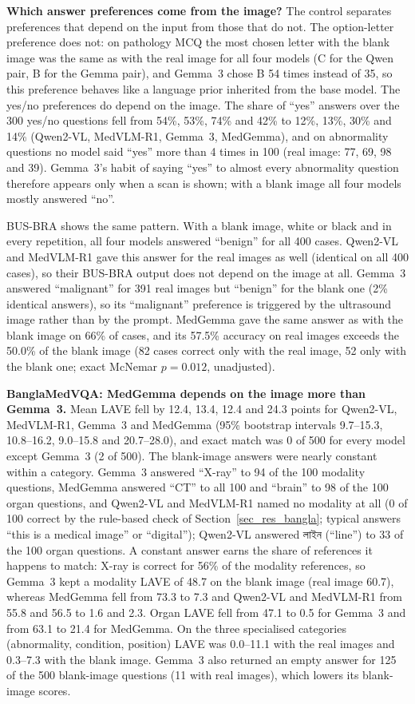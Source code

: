 \documentclass[doublecolumn]{ijcvsplatex}
\newcommand{\bn}[1]{{\bengalifont #1}}
\newcommand{\bn}[1]{\textit{[Bangla]}}
\newcommand{\qwen}{Qwen2-VL}
\newcommand{\medvlm}{MedVLM-R1}
\newcommand{\gemma}{Gemma~3}
\newcommand{\medgemma}{MedGemma}
\begin{document}
{\color{blue}
\textbf{Which answer preferences come from the image?} The control separates preferences that depend on the input from those that do not. The option-letter preference does not: on pathology MCQ the most chosen letter with the blank image was the same as with the real image for all four models (C for the Qwen pair, B for the Gemma pair), and \gemma{} chose B 54 times instead of 35, so this preference behaves like a language prior inherited from the base model. The yes/no preferences do depend on the image. The share of ``yes'' answers over the 300 yes/no questions fell from 54\%, 53\%, 74\% and 42\% to 12\%, 13\%, 30\% and 14\% (\qwen{}, \medvlm{}, \gemma{}, \medgemma{}), and on abnormality questions no model said ``yes'' more than 4 times in 100 (real image: 77, 69, 98 and 39). \gemma{}'s habit of saying ``yes'' to almost every abnormality question therefore appears only when a scan is shown; with a blank image all four models mostly answered ``no''.

BUS-BRA shows the same pattern. With a blank image, white or black and in every repetition, all four models answered ``benign'' for all 400 cases. \qwen{} and \medvlm{} gave this answer for the real images as well (identical on all 400 cases), so their BUS-BRA output does not depend on the image at all. \gemma{} answered ``malignant'' for 391 real images but ``benign'' for the blank one (2\% identical answers), so its ``malignant'' preference is triggered by the ultrasound image rather than by the prompt. \medgemma{} gave the same answer as with the blank image on 66\% of cases, and its 57.5\% accuracy on real images exceeds the 50.0\% of the blank image (82 cases correct only with the real image, 52 only with the blank one; exact McNemar $p=0.012$, unadjusted).

\textbf{BanglaMedVQA: \medgemma{} depends on the image more than \gemma{}.} Mean LAVE fell by 12.4, 13.4, 12.4 and 24.3 points for \qwen{}, \medvlm{}, \gemma{} and \medgemma{} (95\% bootstrap intervals 9.7--15.3, 10.8--16.2, 9.0--15.8 and 20.7--28.0), and exact match was 0 of 500 for every model except \gemma{} (2 of 500). The blank-image answers were nearly constant within a category. \gemma{} answered ``X-ray'' to 94 of the 100 modality questions, \medgemma{} answered ``CT'' to all 100 and ``brain'' to 98 of the 100 organ questions, and \qwen{} and \medvlm{} named no modality at all (0 of 100 correct by the rule-based check of Section~\ref{sec_res_bangla}; typical answers ``this is a medical image'' or ``digital''); \qwen{} answered \bn{লাইন} (``line'') to 33 of the 100 organ questions. A constant answer earns the share of references it happens to match: X-ray is correct for 56\% of the modality references, so \gemma{} kept a modality LAVE of 48.7 on the blank image (real image 60.7), whereas \medgemma{} fell from 73.3 to 7.3 and \qwen{} and \medvlm{} from 55.8 and 56.5 to 1.6 and 2.3. Organ LAVE fell from 47.1 to 0.5 for \gemma{} and from 63.1 to 21.4 for \medgemma{}. On the three specialised categories (abnormality, condition, position) LAVE was 0.0--11.1 with the real images and 0.3--7.3 with the blank image. \gemma{} also returned an empty answer for 125 of the 500 blank-image questions (11 with real images), which lowers its blank-image scores.

}
\end{document}
